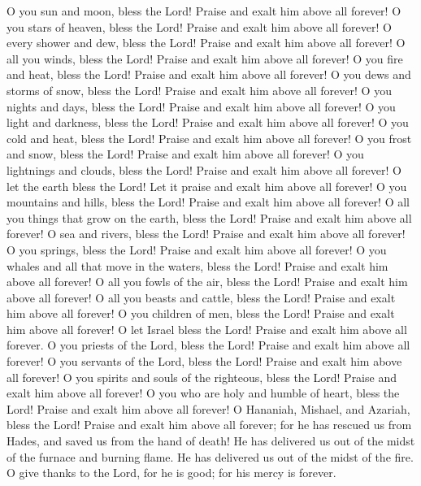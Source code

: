 {O you sun and moon, bless the Lord! Praise and exalt him above all forever!
O you stars of heaven, bless the Lord! Praise and exalt him above all forever!
O every shower and dew, bless the Lord! Praise and exalt him above all forever!
O all you winds, bless the Lord! Praise and exalt him above all forever!
O you fire and heat, bless the Lord! Praise and exalt him above all forever!
O you dews and storms of snow, bless the Lord! Praise and exalt him above all forever!
O you nights and days, bless the Lord! Praise and exalt him above all forever!
O you light and darkness, bless the Lord! Praise and exalt him above all forever!
O you cold and heat, bless the Lord! Praise and exalt him above all forever!
O you frost and snow, bless the Lord! Praise and exalt him above all forever!
O you lightnings and clouds, bless the Lord! Praise and exalt him above all forever!
O let the earth bless the Lord! Let it praise and exalt him above all forever!
O you mountains and hills, bless the Lord! Praise and exalt him above all forever!
O all you things that grow on the earth, bless the Lord! Praise and exalt him above all forever!
O sea and rivers, bless the Lord! Praise and exalt him above all forever!
O you springs, bless the Lord! Praise and exalt him above all forever!
O you whales and all that move in the waters, bless the Lord! Praise and exalt him above all forever!
O all you fowls of the air, bless the Lord! Praise and exalt him above all forever!
O all you beasts and cattle, bless the Lord! Praise and exalt him above all forever!
O you children of men, bless the Lord! Praise and exalt him above all forever!
O let Israel bless the Lord! Praise and exalt him above all forever.
O you priests of the Lord, bless the Lord! Praise and exalt him above all forever!
O you servants of the Lord, bless the Lord! Praise and exalt him above all forever!
O you spirits and souls of the righteous, bless the Lord! Praise and exalt him above all forever!
O you who are holy and humble of heart, bless the Lord! Praise and exalt him above all forever!
O Hananiah, Mishael, and Azariah, bless the Lord! Praise and exalt him above all forever; for he has rescued us from Hades, and saved us from the hand of death! He has delivered us out of the midst of the furnace and burning flame. He has delivered us out of the midst of the fire.
O give thanks to the Lord, for he is good; for his mercy is forever.
}
